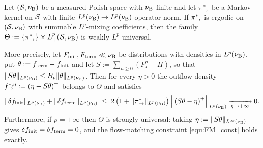 \begin{theorem}
\label{theo:universality_L2_full}
     Let $(\mathcal S,\nu_{\mathrm{B}})$ be a measured Polish space with $\nu_{\mathrm{B}}$ finite and let $\pi_{\rightarrow}^*$ be a Markov kernel on $\mathcal S$ with finite $L^p(\nu_{\mathrm{B}})\rightarrow L^p(\nu_{\mathrm{B}})$ operator norm. If $\pi_{\rightarrow}^*$ is ergodic on $(\mathcal S,\nu_{\mathrm{B}})$ with summable $L^p$-mixing coefficients, then the family $\Theta := \{\pi_{\rightarrow}^*\}\times L^p_+(\mathcal S,\nu_{\mathrm{B}})$ is weakly $L^p$-universal.

     More precisely, let $F_{\mathrm{init}},F_{\mathrm{term}}\ll\nu_{\mathrm{B}}$ be distributions with densities in $L^p(\nu_{\mathrm{B}})$, put $\theta := f_{\mathrm{term}}-f_{\mathrm{init}}$ and let $S:=\sum_{n\geq0}\left(P_\star^n-\Pi\right)$, so that $\|S\theta\|_{L^p(\nu_{\mathrm{B}})}\leq B_p\|\theta\|_{L^p(\nu_{\mathrm{B}})}$. Then for every $\eta>0$ the outflow density $f^{*,\eta}_{\rightarrow} := \left(\eta - S\theta\right)^+$ belongs to $\Theta$ and satisfies
     \begin{equation}\label{equ:universality_quantitative}
         \|\delta f_{\mathrm{init}}\|_{L^p(\nu_{\mathrm{B}})}+\|\delta f_{\mathrm{term}}\|_{L^p(\nu_{\mathrm{B}})} \;\leq\; 2\left(1+\|\pi_{\rightarrow}^*\|_{L^p(\nu_{\mathrm{B}})}\right)\left\|\left(S\theta-\eta\right)^+\right\|_{L^p(\nu_{\mathrm{B}})} \xrightarrow[\eta\rightarrow+\infty]{} 0 .
     \end{equation}
     Furthermore, if $p=+\infty$ then $\Theta$ is strongly universal: taking $\eta := \|S\theta\|_{L^\infty(\nu_{\mathrm{B}})}$ gives $\delta f_{\mathrm{init}} = \delta f_{\mathrm{term}} = 0$, and the flow-matching constraint \eqref{equ:FM_const} holds exactly.
\end{theorem}

